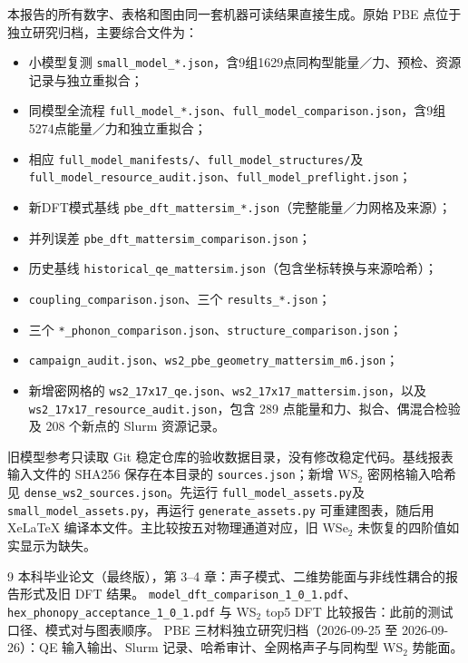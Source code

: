 \documentclass[UTF8,a4paper,11pt,fontset=mac]{ctexart}
\begin{document}
本报告的所有数字、表格和图由同一套机器可读结果直接生成。原始 PBE 点位于独立研究归档，主要综合文件为：
\begin{itemize}\setlength{\itemsep}{0pt}
\item 小模型复测 \texttt{small\_model\_*.json}，含9组1629点同构型能量／力、预检、资源记录与独立重拟合；
\item 同模型全流程 \texttt{full\_model\_*.json}、\texttt{full\_model\_comparison.json}，含9组5274点能量／力和独立重拟合；
\item 相应 \texttt{full\_model\_manifests/}、\texttt{full\_model\_structures/}及
\newline\texttt{full\_model\_resource\_audit.json}、\texttt{full\_model\_preflight.json}；
\item 新DFT模式基线 \texttt{pbe\_dft\_mattersim\_*.json}（完整能量／力网格及来源）；
\item 并列误差 \texttt{pbe\_dft\_mattersim\_comparison.json}；
\item 历史基线 \texttt{historical\_qe\_mattersim.json}（包含坐标转换与来源哈希）；
\item \texttt{coupling\_comparison.json}、三个 \texttt{results\_*.json}；
\item 三个 \texttt{*\_phonon\_comparison.json}、\texttt{structure\_comparison.json}；
\item \texttt{campaign\_audit.json}、\texttt{ws2\_pbe\_geometry\_mattersim\_m6.json}；
\item 新增密网格的 \texttt{ws2\_17x17\_qe.json}、\texttt{ws2\_17x17\_mattersim.json}，以及
\newline\texttt{ws2\_17x17\_resource\_audit.json}，包含 289 点能量和力、拟合、偶混合检验及 208 个新点的 Slurm 资源记录。
\end{itemize}
旧模型参考只读取 Git 稳定仓库的验收数据目录，没有修改稳定代码。基线报表输入文件的 SHA256 保存在本目录的 \texttt{sources.json}；新增 WS$_2$ 密网格输入哈希见 \texttt{dense\_ws2\_sources.json}。先运行 \texttt{full\_model\_assets.py}及\texttt{small\_model\_assets.py}，再运行 \texttt{generate\_assets.py} 可重建图表，随后用 XeLaTeX 编译本文件。主比较按五对物理通道对应，旧 WSe$_2$ 未恢复的四阶值如实显示为缺失。

\begin{thebibliography}{9}
 本科毕业论文（最终版），第 3--4 章：声子模式、二维势能面与非线性耦合的报告形式及旧 DFT 结果。
 \texttt{model\_dft\_comparison\_1\_0\_1.pdf}、\texttt{hex\_phonopy\_acceptance\_1\_0\_1.pdf} 与 WS$_2$ top5 DFT 比较报告：此前的测试口径、模式对与图表顺序。
 PBE 三材料独立研究归档（2026-09-25 至 2026-09-26）：QE 输入输出、Slurm 记录、哈希审计、全网格声子与同构型 WS$_2$ 势能面。
\end{thebibliography}
\end{document}
